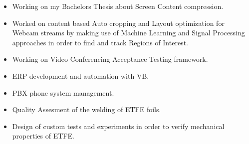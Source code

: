 \documentclass[10pt,a4paper]{altacv}
\begin{document}

\begin{fullwidth}
\makecvheader
\end{fullwidth}



\begin{itemize}
    \item Working on my Bachelors Thesis about Screen Content compression.
    \item Worked on content based Auto cropping and Layout optimization for Webcam streams by making use of Machine Learning and Signal Processing approaches in order to find and track Regions of Interest.
    \item Working on Video Conferencing Acceptance Testing framework.
\end{itemize}

\begin{itemize}
    \item ERP development and automation with VB. 
    \item PBX phone system management.
    \item Quality Assesment of the welding of ETFE foils.
    \item Design of custom tests and experiments in order to verify mechanical properties of ETFE.
\end{itemize}
\end{document}
